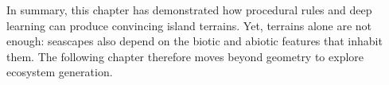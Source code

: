 In summary, this chapter has demonstrated how procedural rules and deep learning can produce convincing island terrains. Yet, terrains alone are not enough: seascapes also depend on the biotic and abiotic features that inhabit them. The following chapter therefore moves beyond geometry to explore ecosystem generation.


\begin{figure}












\end{figure}
